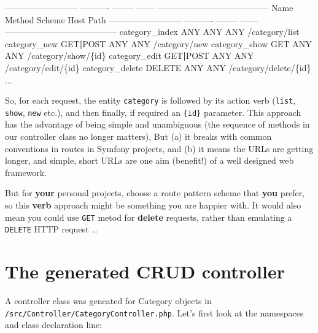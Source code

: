 \documentclass[a4paperpaper,openright]{book}
\newenvironment{Shaded}{}{}
\newcommand{\DataTypeTok}[1]{\textcolor[rgb]{0.56,0.13,0.00}{#1}}
\newcommand{\ExtensionTok}[1]{#1}
\newcommand{\KeywordTok}[1]{\textcolor[rgb]{0.00,0.44,0.13}{\textbf{#1}}}
\newcommand{\NormalTok}[1]{#1}
\begin{document}
\begin{Shaded}
\begin{Highlighting}[]
     \ExtensionTok{--------------------------}\NormalTok{ ---------- -------- ------ ---------------------------------------}
      \ExtensionTok{Name}\NormalTok{                       Method     Scheme   Host   Path}
     \ExtensionTok{--------------------------}\NormalTok{ ---------- -------- ------ ---------------------------------------}
      \ExtensionTok{category_index}\NormalTok{             ANY        ANY      ANY    /category/list}
      \ExtensionTok{category_new}\NormalTok{               GET}\KeywordTok{|}\ExtensionTok{POST}\NormalTok{   ANY      ANY    /category/new}
      \ExtensionTok{category_show}\NormalTok{              GET        ANY      ANY    /category/show/}\DataTypeTok{\{id\}}
      \ExtensionTok{category_edit}\NormalTok{              GET}\KeywordTok{|}\ExtensionTok{POST}\NormalTok{   ANY      ANY    /category/edit/}\DataTypeTok{\{id\}}
      \ExtensionTok{category_delete}\NormalTok{            DELETE     ANY      ANY    /category/delete/}\DataTypeTok{\{id\}}
      \ExtensionTok{...}
\end{Highlighting}
\end{Shaded}

So, for each request, the entity \texttt{category} is followed by its
action verb (\texttt{list}, \texttt{show}, \texttt{new} etc.), and then
finally, if required an \texttt{\{id\}} parameter. This approach has the
advantage of being simple and unambiguous (the sequence of methods in
our controller class no longer matters), But (a) it breaks with common
conventions in routes in Symfony projects, and (b) it means the URLs are
getting longer, and simple, short URLs are one aim (benefit!) of a well
designed web framework.

But for \textbf{your} personal projects, choose a route pattern scheme
that \textbf{you} prefer, so this \textbf{verb} approach might be
something you are happier with. It would also mean you could use
\texttt{GET} metod for \textbf{delete} requests, rather than emulating a
\texttt{DELETE} HTTP request \ldots{}

\hypertarget{the-generated-crud-controller}{%
\section{The generated CRUD
controller}\label{the-generated-crud-controller}}

A controller class was geneated for Category objects in
\texttt{/src/Controller/CategoryController.php}. Let's first look at the
namespaces and class declaration line:
\end{document}
